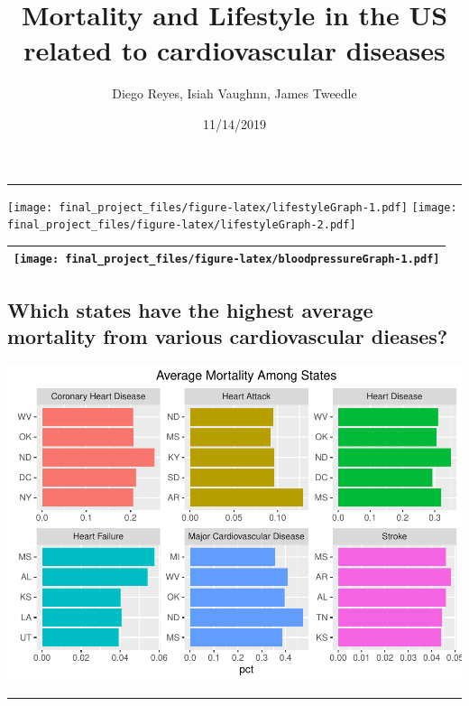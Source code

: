 \documentclass[]{article}
\title{Mortality and Lifestyle in the US related to cardiovascular diseases}
\author{Diego Reyes, Isiah Vaughnn, James Tweedle}
\date{11/14/2019}
\begin{document}
\maketitle

\begin{center}\rule{0.5\linewidth}{\linethickness}\end{center}

\texttt{[image: final\_project\_files/figure-latex/lifestyleGraph-1.pdf]}
\texttt{[image: final\_project\_files/figure-latex/lifestyleGraph-2.pdf]}

\begin{longtable}[]{@{}l@{}}
\toprule
\endhead
\begin{minipage}[t]{0.07\columnwidth}\raggedright
\texttt{[image: final\_project\_files/figure-latex/bloodpressureGraph-1.pdf]}\strut
\end{minipage}\tabularnewline
\bottomrule
\end{longtable}

\hypertarget{which-states-have-the-highest-average-mortality-from-various-cardiovascular-dieases}{%
\subsection{Which states have the highest average mortality from various
cardiovascular
dieases?}\label{which-states-have-the-highest-average-mortality-from-various-cardiovascular-dieases}}

\includegraphics{final_project_files/figure-latex/StateMortality-1.pdf}

\begin{center}\rule{0.5\linewidth}{\linethickness}\end{center}
\end{document}
